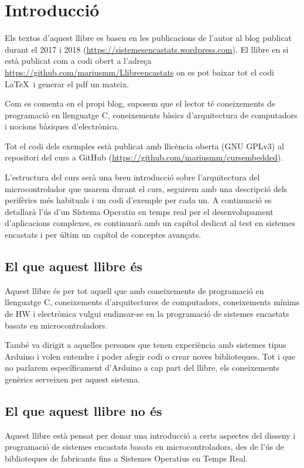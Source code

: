 
\chapter{Introducció}
Els textos d'aquest llibre es basen en les publicacions de l'autor al blog publicat durant el 2017 i 2018 (\url{https://sistemesencastats.wordpress.com}). El llibre en si està publicat com a codi obert a l'adreça \url{https://github.com/mariusmm/Llibreencastats} on es pot baixar tot el codi \LaTeX\ i generar el pdf un mateix.

Com es comenta en el propi blog, suposem que el lector té coneixements de programació en llenguatge C, coneixements bàsics d'arquitectura de computadors i nocions bàsiques d'electrònica.

Tot el codi dels exemples està publicat amb llicència oberta (GNU GPLv3) \cite{gplv3} al repositori del curs a GitHub (\url{https://github.com/mariusmm/cursembedded}).

L'estructura del curs serà una breu introducció sobre l'arquitectura del microcontrolador que usarem durant el curs, seguirem amb una descripció dels perifèrics més habituals i un codi d'exemple per cada un. A continuació es detallarà l'ús d'un Sistema Operatiu en temps real per el desenvolupament d'aplicacions complexes, es continuarà amb un capítol dedicat al test en sistemes encastats i per últim un capítol de conceptes avançats.

\section{El que aquest llibre és}
Aquest llibre és per tot aquell que amb coneixements de programació en llenguatge C, coneixements d'arquitectures de computadors, coneixements mínims de HW i electrònica vulgui endinsar-se en la programació de sistemes encastats basats en microcontroladors.

També va dirigit a aquelles persones que tenen experiència amb sistemes tipus Arduino i volen entendre i poder afegir codi o crear noves biblioteques. Tot i que no parlarem específicament d'Arduino a cap part del llibre, els coneixements genèrics serveixen per aquest sistema.

\section{El que aquest llibre no és}
Aquest llibre està pensat per donar una introducció a certs aspectes del disseny i programació de sistemes encastats basats en microcontroladors, des de l'ús de biblioteques de fabricants fins a Sistemes Operatius en Temps Real.

